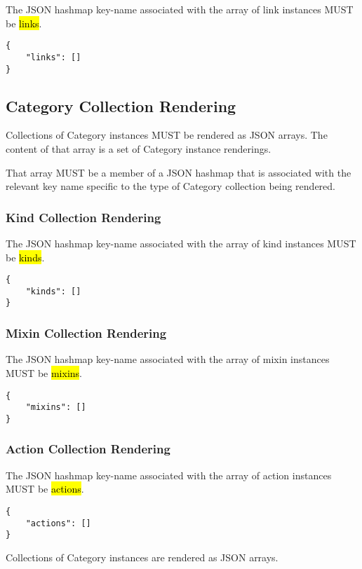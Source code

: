 \documentclass[10pt,a4paper]{article}
\begin{document}
The JSON hashmap key-name associated with the array of link instances MUST be \hl{links}.

\begin{lstlisting}
{
    "links": []
}
\end{lstlisting}

\subsection{Category Collection Rendering}
Collections of Category instances MUST be rendered as JSON arrays. The content of that array is a set of Category instance renderings.

That array MUST be a member of a JSON hashmap that is associated with the relevant key name specific to the type of Category collection being rendered.


\subsubsection{Kind Collection Rendering}

The JSON hashmap key-name associated with the array of kind instances MUST be \hl{kinds}.

\begin{lstlisting}
{
    "kinds": []
}
\end{lstlisting}

\subsubsection{Mixin Collection Rendering}

The JSON hashmap key-name associated with the array of mixin instances MUST be \hl{mixins}.

\begin{lstlisting}
{
    "mixins": []
}
\end{lstlisting}

\subsubsection{Action Collection Rendering}

The JSON hashmap key-name associated with the array of action instances MUST be \hl{actions}.

\begin{lstlisting}
{
    "actions": []
}
\end{lstlisting}


Collections of Category instances are rendered as JSON arrays.
\end{document}
